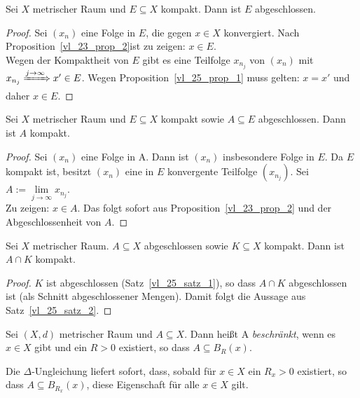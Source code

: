 \begin{Satz}\label{vl_25_satz_1} %
	Sei $X$ metrischer Raum und $E \subseteq X$ kompakt. Dann ist $E$ abgeschlossen. 
\end{Satz}

\begin{proof}
	Sei $(x_n)$ eine Folge in $E$, die gegen $x \in X$ konvergiert. Nach 
	Proposition~\ref{vl_23_prop_2}ist zu zeigen: $x \in E$. \\
	Wegen der Kompaktheit von $E$ gibt es eine Teilfolge $x_{n_j}$ von $(x_n)$ 
	mit \mbox{$x_{n_j} \xRightarrow{j \rightarrow \infty} x' \in E$}. Wegen 
	Proposition~\ref{vl_25_prop_1} muss gelten: $x = x'$ und daher $x \in E$. 
\end{proof}

\begin{Satz}\label{vl_25_satz_2}%
	Sei $X$ metrischer Raum und $E \subseteq X$ kompakt sowie $A \subseteq E$ 
	abgeschlossen. Dann ist $A$ kompakt.
\end{Satz}

\begin{proof}
	Sei $(x_n)$ eine Folge in A. Dann ist $(x_n)$ insbesondere Folge in $E$. 
	Da $E$ kompakt ist, besitzt $(x_n)$ eine in $E$ konvergente 
	Teilfolge $(x_{n_j})$. Sei $A := \lim\limits_{j \rightarrow \infty}{x_{n_j}}$.\\
	Zu zeigen: $x \in A$. Das folgt sofort aus Proposition~\ref{vl_23_prop_2} 
	und der Abgeschlossenheit 
	von $A$.
\end{proof}

\begin{Korollar}%
	Sei $X$ metrischer Raum. $A \subseteq X$ abgeschlossen sowie $K \subseteq X$ 
	kompakt. Dann ist $A \cap K$ kompakt.
\end{Korollar}

\begin{proof}
	$K$ ist abgeschlossen (Satz~\ref{vl_25_satz_1}), so dass $A \cap K$ 
	abgeschlossen ist (als Schnitt abgeschlossener Mengen). Damit folgt die 
	Aussage aus Satz~\ref{vl_25_satz_2}.
\end{proof}

\begin{Definition}%
	Sei $(X,d)$ metrischer Raum und $A \subseteq X$. Dann heißt A \emph{beschränkt}, 
	wenn es $x \in X$ gibt und ein $R> 0$ existiert, so dass $A \subseteq B_R(x)$.
\end{Definition}

\begin{Bemerkung}
	Die $\Delta$-Ungleichung liefert sofort, dass, sobald für $x \in X$ ein $R_x >0$ 
	existiert, so dass $A\subseteq B_{R_x}(x)$, diese Eigenschaft für alle 
	$x\in X$ gilt.
\end{Bemerkung}

